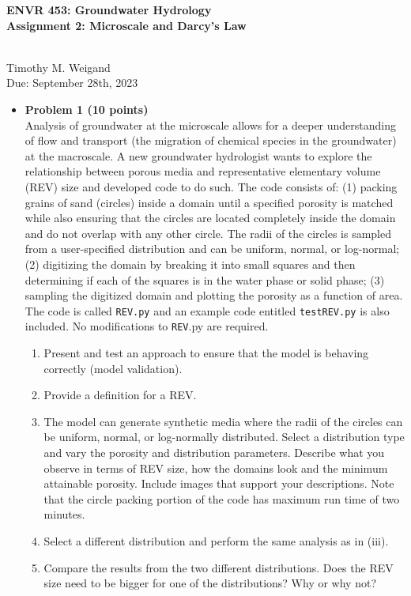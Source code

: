 \documentclass[11pt]{report}
\begin{document}
\begin{center}
\begin{Large}\textbf{ENVR 453: Groundwater Hydrology \\ Assignment 2: Microscale and Darcy's Law} \end{Large}
\\ \vspace{0.1cm} Timothy M. Weigand \vspace{0.1cm}\\ 
Due: September 28th, 2023
\end{center}

\vspace{0.2cm}


\begin{itemize}
\item {\bf Problem 1 (10 points) } \\
Analysis of groundwater at the microscale allows for a deeper understanding of flow and transport (the migration of chemical species in the groundwater) at the macroscale. A new groundwater hydrologist wants to explore the relationship between porous media and representative elementary volume (REV) size and developed code to do such. The code consists of: (1) packing grains of sand (circles) inside a domain until a specified porosity is matched while also ensuring that the circles are located completely inside the domain and do not overlap with any other circle. The radii of the circles is sampled from a user-specified distribution and can be uniform, normal, or log-normal; (2) digitizing the domain by breaking it into small squares and then determining if each of the squares is in the water phase or solid phase; (3) sampling the digitized domain and plotting the porosity as a function of area. The code is called \texttt{REV.py} and an example code entitled \texttt{testREV.py} is also included. No modifications to \texttt{REV}.py are required. 

\begin{enumerate}[label=(\roman*)]
    \item Present and test an approach to ensure that the model is behaving correctly (model validation). 
    \item Provide a definition for a REV. 
    \item The model can generate synthetic media where the radii of the circles can be uniform, normal, or log-normally distributed. Select a distribution type and vary the porosity and distribution parameters. Describe what you observe in terms of REV size, how the domains look and the minimum attainable porosity. Include images that support your descriptions. Note that the circle packing portion of the code has maximum run time of two minutes. 
    \item Select a different distribution and perform the same analysis as in (iii).
    \item Compare the results from the two different distributions. Does the REV size need to be bigger for one of the distributions? Why or why not?      
\end{enumerate}


\end{itemize}
\end{document}
